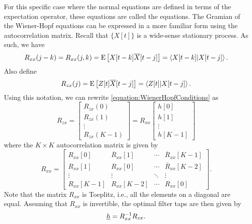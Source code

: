 For this specific case where the normal equations are defined in terms of the expectation operator, these equations are called the  equations.
The Gramian of the Wiener-Hopf equations can be expressed in a more familiar form using the autocorrelation matrix.
Recall that $\{ X[t] \}$ is a wide-sense stationary process.
As such, we have
\begin{equation*}
R_{xx} (j-k) = R_{xx} (j, k) = \mathrm{E} \left[ X[t-k] \overline{X}[t-j] \right]
= \left\langle X[t-k] | X[t-j] \right\rangle .
\end{equation*}
Also define
\begin{equation*}
R_{zx}(j) = \mathrm{E} \left[ Z[t] \overline{X}[t-j] \right]
= \left\langle Z[t] | X[t-j] \right\rangle .
\end{equation*}
Using this notation, we can rewrite \eqref{equation:WienerHopfConditions} as
\begin{equation*}
R_{zx} = \left[ \begin{array}{c}
R_{zx} (0) \\ R_{zx} (1) \\ \vdots \\ R_{zx} (K-1) \end{array} \right]
= R_{xx}
\left[ \begin{array}{c}
h [0] \\
h [1] \\ \vdots \\
h [K-1] \end{array} \right]
\end{equation*}
where the $K \times K$ autocorrelation matrix is given by
\begin{equation*}
R_{xx} = \left[ \begin{array}{cccc}
R_{xx} [0] & \overline{R}_{xx}[1] & \cdots & \overline{R}_{xx}[K-1] \\
R_{xx} [1] & R_{xx}[0] & \cdots & \overline{R}_{xx}[K-2] \\
\vdots & \vdots & \ddots & \vdots \\
R_{xx} [K-1] & R_{xx}[K-2] & \cdots & R_{xx}[0]
\end{array} \right] .
\end{equation*}
Note that the matrix $R_{xx}$ is Toeplitz, i.e., all the elements on a diagonal are equal.
Assuming that $R_{xx}$ is invertible, the optimal filter taps are then given by
\begin{equation*}
\underline{h} = R_{xx}^{-1} R_{zx}.
\end{equation*}

